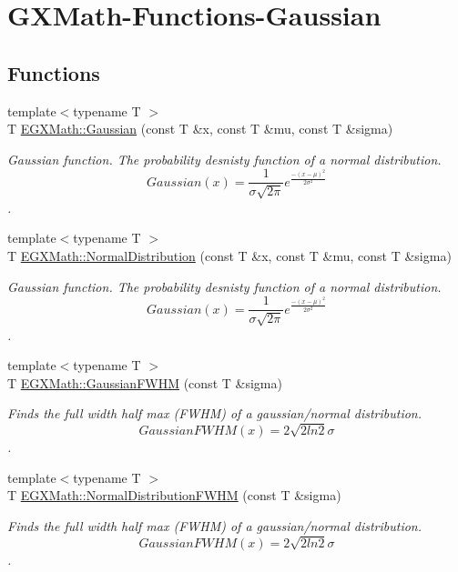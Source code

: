 \hypertarget{group___g_x_math-_functions-_gaussian}{}\section{G\+X\+Math-\/\+Functions-\/\+Gaussian}
\label{group___g_x_math-_functions-_gaussian}
\subsection*{Functions}
\begin{DoxyCompactItemize}
\item 
{\footnotesize template$<$typename T $>$ }\\T \mbox{\hyperlink{group___g_x_math-_functions-_gaussian_ga647b46315081e299edc16a1c7f4e4032}{E\+G\+X\+Math\+::\+Gaussian}} (const T \&x, const T \&mu, const T \&sigma)
\begin{DoxyCompactList}\small\item\em Gaussian function. The probability desnisty function of a normal distribution. \[Gaussian(x)=\frac{1}{\sigma \sqrt{2\pi}}e^{\frac{-(x-\mu)^2}{2\sigma^2}}\]. \end{DoxyCompactList}\item 
{\footnotesize template$<$typename T $>$ }\\T \mbox{\hyperlink{group___g_x_math-_functions-_gaussian_ga3747a7d047293d0e5310ba112bece627}{E\+G\+X\+Math\+::\+Normal\+Distribution}} (const T \&x, const T \&mu, const T \&sigma)
\begin{DoxyCompactList}\small\item\em Gaussian function. The probability desnisty function of a normal distribution. \[Gaussian(x)=\frac{1}{\sigma \sqrt{2\pi}}e^{\frac{-(x-\mu)^2}{2\sigma^2}}\]. \end{DoxyCompactList}\item 
{\footnotesize template$<$typename T $>$ }\\T \mbox{\hyperlink{group___g_x_math-_functions-_gaussian_ga0b8be7b82cb82e871a2613e6a7180431}{E\+G\+X\+Math\+::\+Gaussian\+F\+W\+HM}} (const T \&sigma)
\begin{DoxyCompactList}\small\item\em Finds the full width half max (F\+W\+HM) of a gaussian/normal distribution. \[GaussianFWHM(x)=2\sqrt{2 ln 2} \sigma \]. \end{DoxyCompactList}\item 
{\footnotesize template$<$typename T $>$ }\\T \mbox{\hyperlink{group___g_x_math-_functions-_gaussian_gac537b8c525932979b28101cf432bcc0f}{E\+G\+X\+Math\+::\+Normal\+Distribution\+F\+W\+HM}} (const T \&sigma)
\begin{DoxyCompactList}\small\item\em Finds the full width half max (F\+W\+HM) of a gaussian/normal distribution. \[GaussianFWHM(x)=2\sqrt{2 ln 2} \sigma \]. \end{DoxyCompactList}\end{DoxyCompactItemize}



